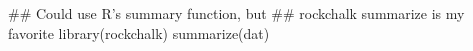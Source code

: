 \begin{Schunk}
\begin{Sinput}
 ## Could use R's summary function, but 
 ## rockchalk summarize is my favorite
 library(rockchalk)
 summarize(dat)
\end{Sinput}
\end{Schunk}
